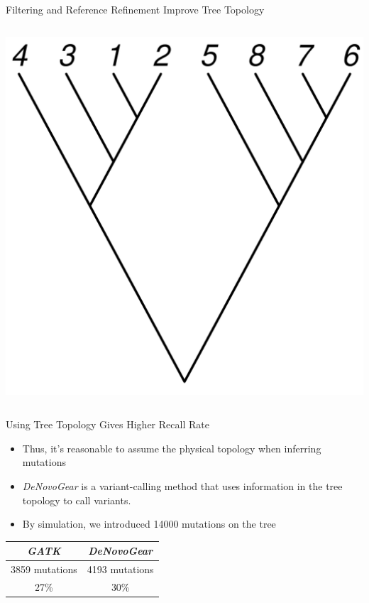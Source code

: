 \documentclass{beamer}
\begin{document}
\begin{frame}{ Filtering and Reference Refinement Improve Tree Topology}
\begin{columns}
		\includegraphics[width=\linewidth,angle=90]{true_tree.pdf}
	\end{columns}
\end{frame}

\begin{frame}{Using Tree Topology Gives Higher Recall Rate}
	\begin{itemize}
	\item Thus, it's reasonable to assume the physical topology when inferring mutations
	\item \textit{DeNovoGear} is a variant-calling method that uses information in the tree topology to call variants.
	\item By simulation, we introduced 14000 mutations on the tree
	\end{itemize}
	\begin{center}
	\begin{tabular}{ c | c }
	\textit{GATK} & \textit{DeNovoGear} \\
	\hline
	3859 mutations & 4193 mutations \\
	27\% & 30\%
	\end{tabular}
	\end{center}
\end{frame}

\end{document}
